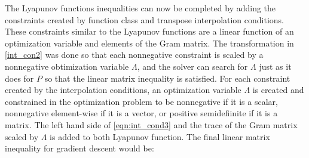 The Lyapunov functions inequalities can now be completed by adding the constraints created by function class and transpose interpolation conditions. These constraints similar to the Lyapunov functions are a linear function of an optimization variable and elements of the Gram matrix. The transformation in \ref{int_con2} was done so that each nonnegative constraint is scaled by a nonnegative obtimization variable $\Lambda$, and the solver can search for $\Lambda$ just as it does for $P$ so that the linear matrix inequality is satisfied. For each constraint created by the interpolation conditions, an optimization variable $\Lambda $ is created and constrained in the optimization problem to be nonnegative if it is a scalar, nonnegative element-wise if it is a vector, or positive semidefiinite if it is a matrix. The left hand side of \ref{eqn:int_cond3} and the trace of the Gram matrix scaled by $\Lambda $ is added to both Lyapunov function. The final linear matrix inequality for gradient descent would be:

